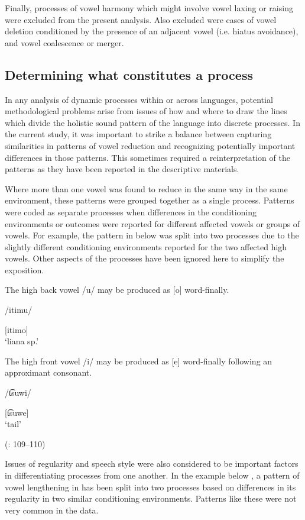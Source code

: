   Finally, processes of vowel harmony which might involve vowel laxing or raising were excluded from the present analysis. Also excluded were cases of vowel deletion conditioned by the presence of an adjacent vowel (i.e. hiatus avoidance), and vowel coalescence or merger.

\subsection{Determining what constitutes a process}\label{sec:6.2.2}

  In any analysis of dynamic processes within or across languages, potential meth\-odological problems arise from issues of how and where to draw the lines which divide the holistic sound pattern of the language into discrete processes. In the current study, it was important to strike a balance between capturing similarities in patterns of vowel reduction and recognizing potentially important differences in those patterns. This sometimes required a reinterpretation of the patterns as they have been reported in the descriptive materials.

  Where more than one vowel was found to reduce in the same way in the same environment, these patterns were grouped together as a single process. Patterns were coded as separate processes when differences in the conditioning environments or outcomes were reported for different affected vowels or groups of vowels. For example, the pattern in  below was split into two processes due to the slightly different conditioning environments reported for the two affected high vowels. Other aspects of the processes have been ignored here to simplify the exposition.

\ea\label{ex:6.11}

\ea  The high back vowel /u/ may be produced as [o] word-finally.

/itimu/

[itimo]\\
\glt ‘liana sp.’

\ex   The high front vowel /i/ may be produced as [e] word-finally following an approximant consonant.

/t͡suwi/

[t͡suwe]\\
\glt ‘tail’

(\citealt{VallejosYopán2010}: 109--110)
\z
\z

  Issues of regularity and speech style were also considered to be important factors in differentiating processes from one another. In the example below , a pattern of vowel lengthening in  has been split into two processes based on differences in its regularity in two similar conditioning environments. Patterns like these were not very common in the data.


